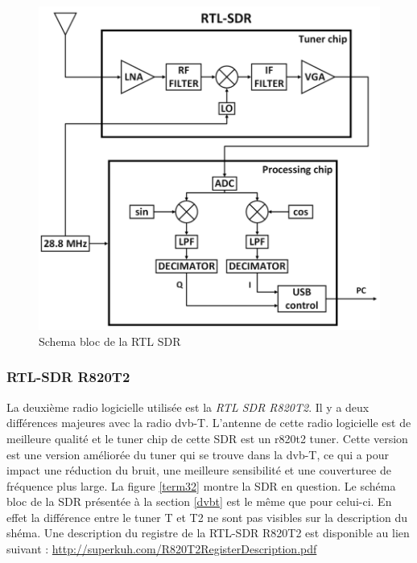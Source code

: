 \begin{figure}[h]
\centering

\includegraphics[scale=0.5]{images/SB-rtlsdr.png}
\caption{Schema bloc de la RTL SDR\cite{SBrtlsdr}}\label{term3000}
\end{figure}



\subsubsection{RTL-SDR R820T2}

La deuxième radio logicielle utilisée est la \textit{RTL SDR R820T2}. Il y a deux différences majeures avec la radio dvb-T. L'antenne de cette radio logicielle est de meilleure qualité et le tuner chip de cette SDR est un r820t2 tuner. Cette version est une version améliorée du tuner qui se trouve dans la dvb-T, ce qui a pour impact une réduction du bruit, une meilleure sensibilité et une couverturee de fréquence plus large. La figure \ref{term32} montre la SDR en question. Le schéma bloc de la SDR présentée à la section \ref{dvbt} est le même que pour celui-ci. En effet la différence entre le tuner T et T2 ne sont pas visibles sur la description du shéma. Une description du registre de la RTL-SDR R820T2 est disponible au lien suivant : \href{http://superkuh.com/R820T2_Register_Description.pdf}{http://superkuh.com/R820T2RegisterDescription.pdf}


